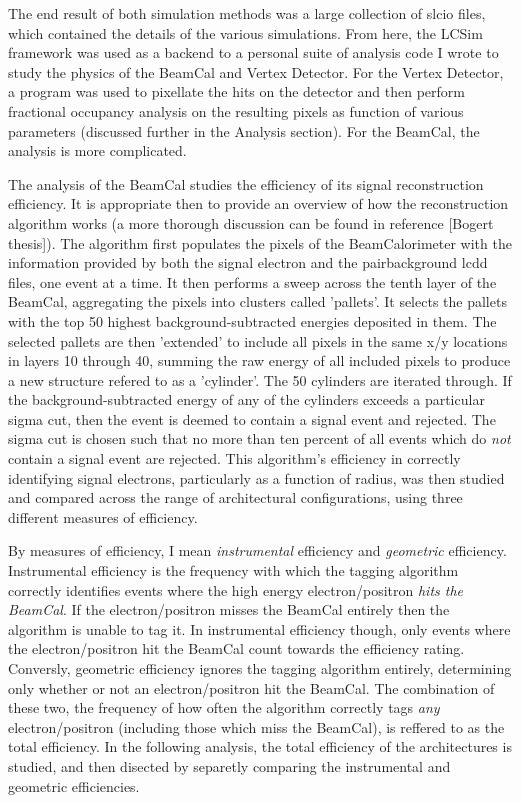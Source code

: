 \documentclass{report}
\begin{document}
            The end result of both simulation methods was a large collection of slcio files, which contained the details of the various simulations. From here, the LCSim framework was used as a backend to a personal suite of analysis code I wrote to study the physics of the BeamCal and Vertex Detector. For the Vertex Detector, a program was used to pixellate the hits on the detector and then perform fractional occupancy analysis on the resulting pixels as function of various parameters (discussed further in the Analysis section). For the BeamCal, the analysis is more complicated.
            
            The analysis of the BeamCal studies the efficiency of its signal reconstruction efficiency. It is appropriate then to provide an overview of how the reconstruction algorithm works (a more thorough discussion can be found in reference [Bogert thesis]). The algorithm first populates the pixels of the BeamCalorimeter with the information provided by both the signal electron and the pairbackground lcdd files, one event at a time. It then performs a sweep across the tenth layer of the BeamCal, aggregating the pixels into clusters called 'pallets'. It selects the pallets with the top 50 highest background-subtracted energies deposited in them. The selected pallets are then 'extended' to include all pixels in the same x/y locations in layers 10 through 40, summing the raw energy of all included pixels to produce a new structure refered to as a 'cylinder'. The 50 cylinders are iterated through. If the background-subtracted energy of any of the cylinders exceeds a particular sigma cut, then the event is deemed to contain a signal event and rejected. The sigma cut is chosen such that no more than ten percent of all events which do \textit{not} contain a signal event are rejected. This algorithm's efficiency in correctly identifying signal electrons, particularly as a function of radius, was then studied and compared across the range of architectural configurations, using three different measures of efficiency.

            By measures of efficiency, I mean \textit{instrumental} efficiency and \textit{geometric} efficiency. Instrumental efficiency is the frequency with which the tagging algorithm correctly identifies events where the high energy electron/positron \textit{hits the BeamCal}. If the electron/positron misses the BeamCal entirely then the algorithm is unable to tag it. In instrumental efficiency though, only events where the electron/positron hit the BeamCal count towards the efficiency rating. Conversly, geometric efficiency ignores the tagging algorithm entirely, determining only whether or not an electron/positron hit the BeamCal. The combination of these two, the frequency of how often the algorithm correctly tags \textit{any} electron/positron (including those which miss the BeamCal), is reffered to as the total efficiency. In the following analysis, the total efficiency of the architectures is studied, and then disected by separetly comparing the instrumental and geometric efficiencies.
\end{document}
